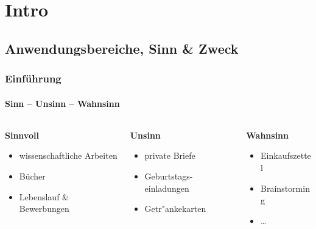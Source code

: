\section{Intro} 

\subsection{Anwendungsbereiche, Sinn \& Zweck}
\begin{frame}[t]
\frametitle{Einf\"uhrung}
\framesubtitle{Sinn -- Unsinn -- Wahnsinn}
\bigskip
\bigskip
\bigskip

\begin{columns}[t]
\begin{column}{.3\textwidth}
\textbf{Sinnvoll}\\[3mm]
\begin{itemize}
\item wissenschaftliche Arbeiten
\item Bücher
\item Lebenslauf \& Bewerbungen
\end{itemize}
\end{column}
\begin{column}{.30\textwidth}
\textbf{Unsinn}\\[3mm]
\begin{itemize}
\item private Briefe
\item Geburtstags-einladungen
\item Getr"ankekarten
\end{itemize}
\end{column}
\begin{column}{.3\textwidth}
\textbf{Wahnsinn}\\[3mm]
\begin{itemize}
\item Einkaufszettel
\item Brainstorming
\item \ldots 
\end{itemize}
\end{column}
\end{columns}
\end{frame}


